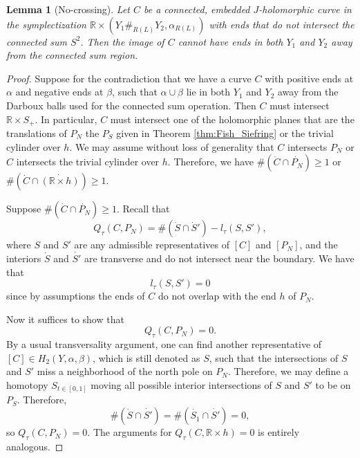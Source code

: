 \documentclass{article}
\numberwithin{equation}{section}
\newtheorem{lemma}[theorem]{Lemma}
\theoremstyle{definition}
\newcommand{\R}{\mathbb{R}}
\begin{document}
\begin{lemma}[No-crossing]
\label{lem:no_crossing}
Let $C$ be a connected, embedded $J$-holomorphic curve in the symplectization $\R \times (Y_1 \#_{R(L)} Y_2, \alpha_{R(L)})$ with ends that do not intersect the connected sum $S^2$. Then the image of $C$ cannot have ends in both $Y_1$ and $Y_2$ away from the connected sum region.
\end{lemma}
\begin{proof}
Suppose for the contradiction that we have a curve $C$ with positive ends at $\alpha$ and negative ends at $\beta$, such that $\alpha \cup \beta$ lie in both $Y_1$ and $Y_2$ away from the Darboux balls used for the connected sum operation. Then $C$ must intersect $\R \times S_+$. In particular, $C$ must intersect one of the holomorphic planes that are the translations of $P_N$ the $P_S$ given in Theorem \ref{thm:Fish_Siefring} or the trivial cylinder over $h$. We may assume without loss of generality that $C$ intersects $P_N$ or $C$ intersects the trivial cylinder over $h$. Therefore, we have $\# (\dot{C} \cap \dot{P_N}) \geq 1$ or $\# (\dot{C} \cap \dot{(\R \times h)}) \geq 1$. 

Suppose $\# (\dot{C} \cap \dot{P_N}) \geq 1$. Recall that 
$$Q_{\tau}(C,P_N) = \#(\dot{S} \cap \dot{S}') - l_{\tau}(S,S'),$$
where $S$ and $S'$ are any admissible representatives of $[C]$ and $[P_N]$, and the interiors $\dot{S}$ and $\dot{S'}$ are transverse and do not intersect near the boundary. We have that 
$$l_{\tau}(S,S') = 0$$ 
since by assumptions the ends of $C$ do not overlap with the end $h$ of $P_N$. 

Now it suffices to show that $$Q_{\tau}(C,P_N) =0.$$ 
By a usual transversality argument, one can find another representative of $[C]\in H_2(Y, \alpha, \beta)$, which is still denoted as $S$, such that the intersections of $S$ and $S'$ miss a neighborhood of the north pole on $P_N$. Therefore, we may define a homotopy $S_{t\in [0,1]}$ moving all possible interior intersections of $S$ and $S'$ to be on $P_S$. Therefore, 
$$\#(\dot{S} \cap \dot{S'}) = \#(\dot{S_1} \cap \dot{S'}) = 0,$$ 
so $Q_{\tau}(C,P_N) = 0$. The arguments for $Q_{\tau}(C, \R \times h) = 0$ is entirely analogous.
\end{proof}
\end{document}
